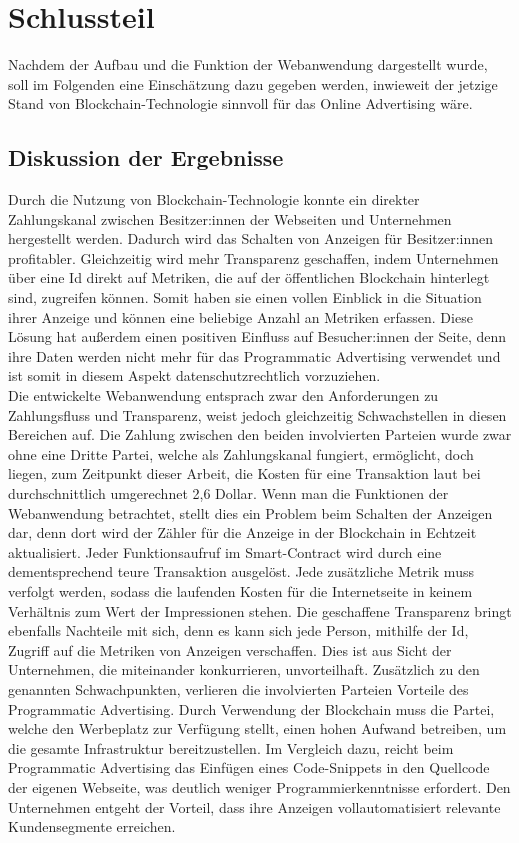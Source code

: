 \chapter{Schlussteil}
Nachdem der Aufbau und die Funktion der Webanwendung dargestellt wurde, soll im Folgenden eine Einschätzung dazu gegeben werden, inwieweit der jetzige Stand von Blockchain-Technologie sinnvoll für das Online Advertising wäre.
\section{Diskussion der Ergebnisse}
Durch die Nutzung von Blockchain-Technologie konnte ein direkter Zahlungskanal zwischen Besitzer:innen der Webseiten und Unternehmen hergestellt werden. Dadurch wird das Schalten von Anzeigen für Besitzer:innen profitabler. Gleichzeitig wird mehr Transparenz geschaffen, indem Unternehmen über eine Id direkt auf Metriken, die auf der öffentlichen Blockchain hinterlegt sind, zugreifen können. Somit haben sie einen vollen Einblick in die Situation ihrer Anzeige und können eine beliebige Anzahl an Metriken erfassen. Diese Lösung hat außerdem einen positiven Einfluss auf Besucher:innen der Seite, denn ihre Daten werden nicht mehr für das Programmatic Advertising verwendet und ist somit in diesem Aspekt datenschutzrechtlich vorzuziehen.\\

Die entwickelte Webanwendung entsprach zwar den Anforderungen zu Zahlungsfluss und Transparenz, weist jedoch gleichzeitig Schwachstellen in diesen Bereichen auf. Die Zahlung zwischen den beiden involvierten Parteien wurde zwar ohne eine Dritte Partei, welche als Zahlungskanal fungiert, ermöglicht, doch liegen, zum Zeitpunkt dieser Arbeit, die Kosten für eine Transaktion laut \cite{etherscan_2021} bei durchschnittlich umgerechnet 2,6 Dollar. Wenn man die Funktionen der Webanwendung betrachtet, stellt dies ein Problem beim Schalten der Anzeigen dar, denn dort wird der Zähler für die Anzeige in der Blockchain in Echtzeit aktualisiert. Jeder Funktionsaufruf im Smart-Contract wird durch eine dementsprechend teure Transaktion ausgelöst. Jede zusätzliche Metrik muss verfolgt werden, sodass die laufenden Kosten für die Internetseite in keinem Verhältnis zum Wert der Impressionen stehen. 
Die geschaffene Transparenz bringt ebenfalls Nachteile mit sich, denn es kann sich jede Person, mithilfe der Id, Zugriff auf die Metriken von Anzeigen verschaffen. Dies ist aus Sicht der Unternehmen, die miteinander konkurrieren, unvorteilhaft. Zusätzlich zu den genannten Schwachpunkten, verlieren die involvierten Parteien Vorteile des Programmatic Advertising. Durch Verwendung der Blockchain muss die Partei, welche den Werbeplatz zur Verfügung stellt, einen hohen Aufwand betreiben, um die gesamte Infrastruktur bereitzustellen. Im Vergleich dazu, reicht beim Programmatic Advertising das Einfügen eines Code-Snippets in den Quellcode der eigenen Webseite, was deutlich weniger Programmierkenntnisse erfordert. Den Unternehmen entgeht der Vorteil, dass ihre Anzeigen vollautomatisiert relevante Kundensegmente erreichen.\\

